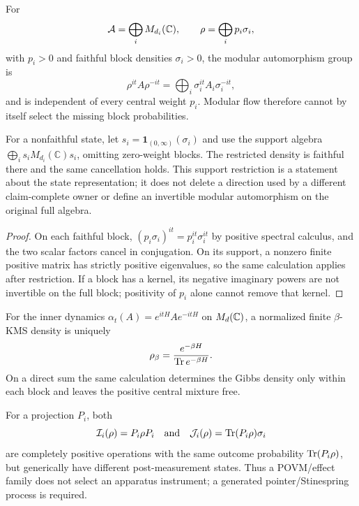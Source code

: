 \documentclass[12pt,a4paper]{article}
\begin{document}
\begin{proposition}
\label{p4:prop:modular-central-weight-blindness}
For
\[
 \mathcal A=\bigoplus_iM_{d_i}(\mathbb{C}),
 \qquad
 \rho=\bigoplus_i p_i\sigma_i,
\]
with \(p_i>0\) and faithful block densities \(\sigma_i>0\), the modular
automorphism group is
\[
 \rho^{it}A\rho^{-it}
 =\bigoplus_i\sigma_i^{it}A_i\sigma_i^{-it},
\]
and is independent of every central weight $p_i$.  Modular flow therefore
cannot by itself select the missing block probabilities.

For a nonfaithful state, let \(s_i=\mathbf1_{(0,\infty)}(\sigma_i)\) and
use the support algebra
\(\bigoplus_i s_iM_{d_i}(\mathbb C)s_i\), omitting zero-weight blocks.
The restricted density is faithful there and the same cancellation holds.
This support restriction is a statement about the state representation;
it does not delete a direction used by a different claim-complete owner
or define an invertible modular automorphism on the original full algebra.
\end{proposition}

\begin{proof}
On each faithful block,
\((p_i\sigma_i)^{it}=p_i^{it}\sigma_i^{it}\) by positive spectral
calculus, and the two scalar factors cancel in conjugation.  On its support,
a nonzero finite positive matrix has strictly positive eigenvalues, so the
same calculation applies after restriction.  If a block has a kernel,
its negative imaginary powers are not invertible on the full block;
positivity of \(p_i\) alone cannot remove that kernel.
\end{proof}

\begin{theorem}
\label{p4:thm:finite-simple-kms-uniqueness}
For the inner dynamics $\alpha_t(A)=e^{itH}Ae^{-itH}$ on $M_d(\mathbb{C})$, a
normalized finite $\beta$-KMS density is uniquely
\[
 \rho_\beta=\frac{e^{-\beta H}}{\operatorname{Tr} e^{-\beta H}}.
\]
On a direct sum the same calculation determines the Gibbs density only within
each block and leaves the positive central mixture free.
\end{theorem}

\begin{proposition}
\label{p4:prop:effect-instrument-nonselection}
For a projection $P_i$, both
\[
 \mathcal I_i(\rho)=P_i\rho P_i
 \quad\text{and}\quad
 \mathcal J_i(\rho)=\operatorname{Tr}(P_i\rho)\sigma_i
\]
are completely positive operations with the same outcome probability
$\operatorname{Tr}(P_i\rho)$, but generically have different post-measurement states.  Thus
a POVM/effect family does not select an apparatus instrument; a generated
pointer/Stinespring process is required.
\end{proposition}
\end{document}
